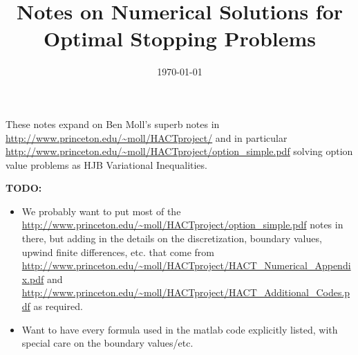 \documentclass[11pt]{etk-article}
\begin{document}
\title{Notes on Numerical Solutions for Optimal Stopping Problems}
\date{\today}
\maketitle
These notes expand on Ben Moll's superb notes in \url{http://www.princeton.edu/~moll/HACTproject/} and in particular \url{http://www.princeton.edu/~moll/HACTproject/option_simple.pdf} solving option value problems as HJB Variational Inequalities.

\textbf{TODO:}
\begin{itemize}
	\item We probably want to put most of the \url{http://www.princeton.edu/~moll/HACTproject/option_simple.pdf} notes in there, but adding in the details on the discretization, boundary values, upwind finite differences, etc. that come from \url{http://www.princeton.edu/~moll/HACTproject/HACT_Numerical_Appendix.pdf} and \url{http://www.princeton.edu/~moll/HACTproject/HACT_Additional_Codes.pdf} as required.
	\item Want to have every formula used in the matlab code explicitly listed, with special care on the boundary values/etc.
\end{itemize}
\end{document}
